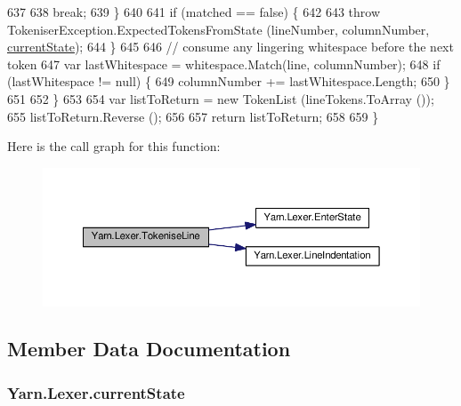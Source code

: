 \begin{DoxyCode}
637 
638                     \textcolor{keywordflow}{break};
639                 \}
640 
641                 \textcolor{keywordflow}{if} (matched == \textcolor{keyword}{false}) \{
642 
643                     \textcolor{keywordflow}{throw} TokeniserException.ExpectedTokensFromState (lineNumber, columnNumber, 
      \hyperlink{a00127_ac90b7dce8103425a148f9e8588f14137}{currentState});
644                 \}
645 
646                 \textcolor{comment}{// consume any lingering whitespace before the next token}
647                 var lastWhitespace = whitespace.Match(line, columnNumber);
648                 \textcolor{keywordflow}{if} (lastWhitespace != null) \{
649                     columnNumber += lastWhitespace.Length;
650                 \}
651 
652             \}
653 
654             var listToReturn = \textcolor{keyword}{new} TokenList (lineTokens.ToArray ());
655             listToReturn.Reverse ();
656 
657             \textcolor{keywordflow}{return} listToReturn;
658 
659         \}
\end{DoxyCode}


Here is the call graph for this function\-:
\nopagebreak
\begin{figure}[H]
\begin{center}
\leavevmode
\includegraphics[width=350pt]{a00127_a20b63f6ef434f6a40fd388f262f03fa8_cgraph}
\end{center}
\end{figure}




\subsection{Member Data Documentation}
\hypertarget{a00127_ac90b7dce8103425a148f9e8588f14137}{
\subsubsection[{current\-State}]{ Yarn.\-Lexer.\-current\-State\hspace{0.3cm}{\ttfamily [private]}}}\label{a00127_ac90b7dce8103425a148f9e8588f14137}


